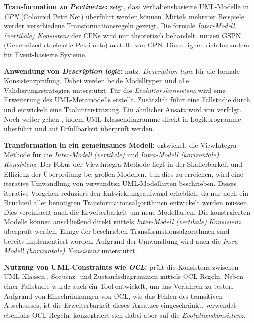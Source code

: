 \textbf{Transformation zu \emph{Pertinetze}:}
\cite{Shinkawa2006} zeigt, dass verhaltensbasierte UML-Modelle in \emph{CPN} (Coloured Petri Net) überführt werden können.
Mittels mehrerer Beispiele werden verschiedene Transformationsregeln gezeigt.
Die formale \emph{Inter-Modell (vertikale) Konsistenz} der CPNs wird nur theoretisch behandelt. \cite{bernardi2002uml} nutzen GSPN (Generalized stochastic Petri nets) anstelle von CPN.
Diese eignen sich besonders für Event-basierte Systeme.

\textbf{Anwendung von \emph{Description logic}:}
\cite{Mens2005} nutzt \emph{Description logic} für die formale Konsistenzprüfung.
Dabei werden beide Modelltypen und alle Validierungsstrategien unterstützt.
Für die \emph{Evolutionskonsistenz} wird eine Erweiterung des UML-Metamodells erstellt.
Zusätzlich führt \cite{Mens2005} eine Fallstudie durch und entwickelt eine Toolunterstützung.
Ein ähnlicher Ansatz wird von \cite{Simmonds2004} verfolgt.
Noch weiter gehen \cite{satoh2006contradiction}, indem UML-Klassendiagramme direkt in Logikprogramme überführt und auf Erfüllbarkeit überprüft werden.

\textbf{Transformation in ein gemeinsames Modell:}
\cite{Egyed2001} entwickelt die ViewIntegra Methode für die  \emph{Inter-Modell (vertikale)} und \emph{Intra-Modell (horizontale) Konsistenz}.
Der Fokus der ViewIntegra Methode liegt in der Skalierbarkeit und Effizienz der Überprüfung bei großen Modellen.
Um dies zu erreichen, wird eine iterative Umwandlung von verwandten UML-Modellarten beschrieben.
Dieses iterative Vorgehen reduziert den Entwicklungsaufwand erheblich, da nur noch ein Bruchteil aller benötigten Transformationsalgorithmen entwickelt werden müssen.
Dies vereinfacht auch die Erweiterbarkeit um neue Modellarten.
Die konstruierten Modelle können anschließend direkt mittels \emph{Inter-Modell (vertikale) Konsistenz} überprüft werden.
Einige der beschrieben Transformationsalgorithmen sind bereits implementiert worden.
Aufgrund der Umwandlung wird auch die \emph{Intra-Modell (horizontale) Konsistenz} unterstützt.

\textbf{Nutzung von UML-Constraints wie \emph{OCL}:}
\cite{Egyed2006} prüft die Konsistenz zwischen UML-Klassen-, Sequenz- und Zustandsdiagrammen mittels OCL-Regeln.
Neben einer Fallstudie wurde auch ein Tool entwickelt, um das Verfahren zu testen.
Aufgrund von Einschränkungen von OCL, wie das Fehlen des transitiven Abschlusses, ist die Erweiterbarkeit dieses Ansatzes eingeschränkt.
\cite{Briand2003} verwendet ebenfalls OCL-Regeln, konzentriert sich dabei aber auf die \emph{Evolutionskonsistenz}.

